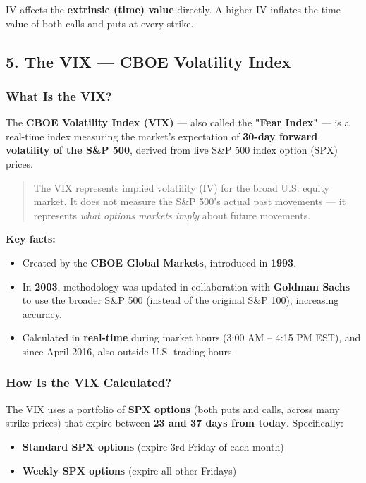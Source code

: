 \documentclass[12pt,openany]{book}
\begin{document}
IV affects the \textbf{extrinsic (time) value} directly. A higher IV inflates the time value of both calls and puts at every strike.

\subsection{5. The VIX — CBOE Volatility Index}

\subsubsection{What Is the VIX?}

The \textbf{CBOE Volatility Index (VIX)} — also called the \textbf{"Fear Index"} — is a real-time index measuring the market's expectation of \textbf{30-day forward volatility of the S\&P 500}, derived from live S\&P 500 index option (SPX) prices.

\begin{quote}
The VIX represents implied volatility (IV) for the broad U.S. equity market. It does not measure the S\&P 500's actual past movements — it represents \emph{what options markets imply} about future movements.
\end{quote}

\textbf{Key facts:}
\begin{itemize}[leftmargin=*]
    \item Created by the \textbf{CBOE Global Markets}, introduced in \textbf{1993}.
    \item In \textbf{2003}, methodology was updated in collaboration with \textbf{Goldman Sachs} to use the broader S\&P 500 (instead of the original S\&P 100), increasing accuracy.
    \item Calculated in \textbf{real-time} during market hours (3:00 AM – 4:15 PM EST), and since April 2016, also outside U.S. trading hours.
\end{itemize}

\subsubsection{How Is the VIX Calculated?}

The VIX uses a portfolio of \textbf{SPX options} (both puts and calls, across many strike prices) that expire between \textbf{23 and 37 days from today}. Specifically:
\begin{itemize}[leftmargin=*]
    \item \textbf{Standard SPX options} (expire 3rd Friday of each month)
    \item \textbf{Weekly SPX options} (expire all other Fridays)
\end{itemize}
\end{document}
